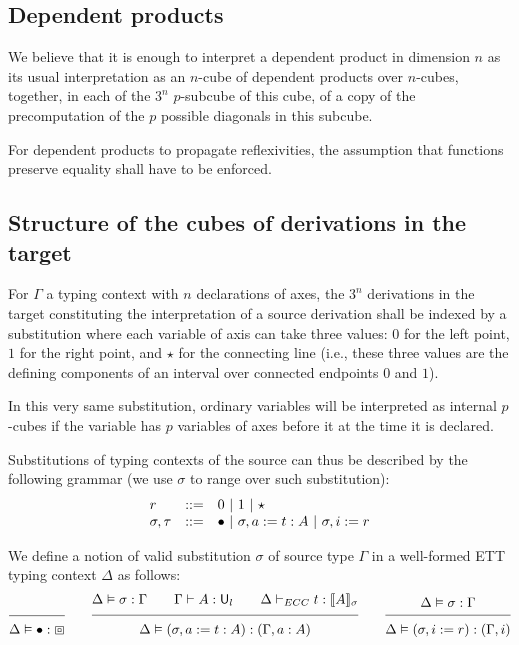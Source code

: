 \documentclass{article}
\newcommand{\emptyctx}{\boxbox}
\newcommand{\sort}[1]{\mathsf{U}_{#1}}
\begin{document}
\subsection{Dependent products}

We believe that it is enough to interpret a dependent product in
dimension $n$ as its usual interpretation as an $n$-cube of dependent
products over $n$-cubes, together, in each of the $3^n$ $p$-subcube of
this cube, of a copy of the precomputation of the $p$ possible
diagonals in this subcube.

For dependent products to propagate reflexivities, the assumption that
functions preserve equality shall have to be enforced.

\subsection{Structure of the cubes of derivations in the target}

For $\Gamma$ a typing context with $n$ declarations of axes, the $3^n$
derivations in the target constituting the interpretation of a source
derivation shall be indexed by a substitution where each variable of
axis can take three values: $0$ for the left point, $1$ for the right
point, and $\star$ for the connecting line (i.e., these three values
are the defining components of an interval over connected endpoints
$0$ and $1$).

In this very same substitution, ordinary variables will be interpreted
as internal $p$-cubes if the variable has $p$ variables of axes before
it at the time it is declared.

Substitutions of typing contexts of the source can thus be described
by the following grammar (we use $\sigma$ to range over such
substitution):
$$
\begin{array}{lcl}
r & ::= & 0 ~|~ 1 ~|~ \star\\
\sigma, \tau & ::= & \bullet ~|~ \sigma, a:=t:A ~|~ \sigma, i:=r\\
\end{array}
$$

We define a notion of valid substitution $\sigma$ of source type
$\Gamma$ in a well-formed ETT typing context $\Delta$ as follows:
$$
\seq{}
    {\Delta \vDash \emptysigma : \emptyctx}
\qquad
\seq{\Delta \vDash \sigma : \Gamma
\qquad \Gamma \vdash A : \sort{l} \qquad \Delta \vdash_{ECC} t : \semnew{\sigma}{A}
}
    {\Delta \vDash (\sigma,a:=t:A) : (\Gamma,a:A)}
\qquad
\seq{\Delta \vDash \sigma : \Gamma}
    {\Delta \vDash (\sigma,i:=r) : (\Gamma,i)}
$$
\end{document}
